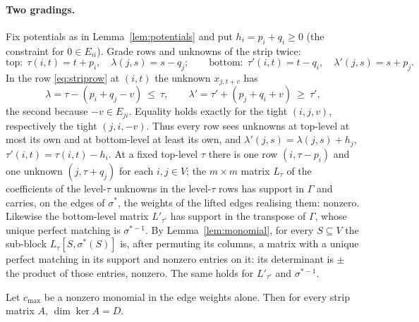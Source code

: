 \paragraph{Two gradings.}
Fix potentials as in Lemma~\ref{lem:potentials} and put $h_i=p_i+q_i\ge0$ (the
constraint for $0\in E_{ii}$). Grade rows and unknowns of the strip twice:
\[
  \text{top:}\ \ \tau(i,t)=t+p_i,\quad \lambda(j,s)=s-q_j;\qquad
  \text{bottom:}\ \ \tau'(i,t)=t-q_i,\quad \lambda'(j,s)=s+p_j .
\]
In the row \eqref{eq:striprow} at $(i,t)$ the unknown $x_{j,t+v}$ has
\[
  \lambda=\tau-(p_i+q_j-v)\ \le\ \tau,\qquad
  \lambda'=\tau'+(p_j+q_i+v)\ \ge\ \tau' ,
\]
the second because $-v\in E_{ji}$. Equality holds exactly for the tight
$(i,j,v)$, respectively the tight $(j,i,-v)$. Thus every row sees unknowns at
top-level at most its own and at bottom-level at least its own, and
$\lambda'(j,s)=\lambda(j,s)+h_j$, $\tau'(i,t)=\tau(i,t)-h_i$. At a fixed
top-level $\tau$ there is one row $(i,\tau-p_i)$ and one unknown $(j,\tau+q_j)$
for each $i,j\in V$; the $m\times m$ matrix $L_\tau$ of the coefficients of the
level-$\tau$ unknowns in the level-$\tau$ rows has support in $\Gamma$ and
carries, on the edges of $\sigma^*$, the weights of the lifted edges realising
them: nonzero. Likewise the bottom-level matrix $L'_{\tau'}$ has support in the
transpose of $\Gamma$, whose unique perfect matching is $\sigma^{*-1}$. By
Lemma~\ref{lem:monomial}, for every $S\subseteq V$ the sub-block
$L_\tau[S,\sigma^*(S)]$ is, after permuting its columns, a matrix with a
unique perfect matching in its support and nonzero entries on it: its
determinant is $\pm$ the product of those entries, nonzero. The same holds for
$L'_{\tau'}$ and $\sigma^{*-1}$.

\begin{theorem}\label{thm:stripdim}
Let $c_{\max}$ be a nonzero monomial in the edge weights alone. Then for every
strip matrix $A$, $\dim\ker A=D$.
\end{theorem}

